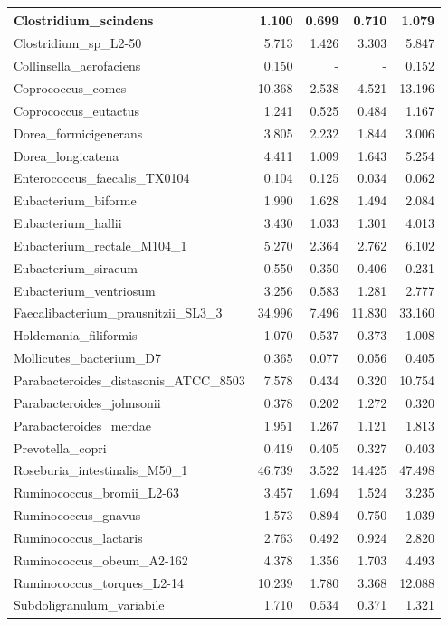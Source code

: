 \documentclass[12pt,a4paper]{article}
\begin{document}
\begin{table}[ht]
\begin{center}
\begin{tabular}{|l*{4}{|r}|}
Clostridium\_scindens & 1.100 & 0.699 & 0.710 & 1.079 \\ \hline
Clostridium\_sp\_L2-50 & 5.713 & 1.426 & 3.303 & 5.847 \\ \hline
Collinsella\_aerofaciens & 0.150 & - & - & 0.152 \\ \hline
Coprococcus\_comes & 10.368 & 2.538 & 4.521 & 13.196 \\ \hline
Coprococcus\_eutactus & 1.241 & 0.525 & 0.484 & 1.167 \\ \hline
Dorea\_formicigenerans & 3.805 & 2.232 & 1.844 & 3.006 \\ \hline
Dorea\_longicatena & 4.411 & 1.009 & 1.643 & 5.254 \\ \hline
Enterococcus\_faecalis\_TX0104 & 0.104 & 0.125 & 0.034 & 0.062 \\ \hline
Eubacterium\_biforme & 1.990 & 1.628 & 1.494 & 2.084 \\ \hline
Eubacterium\_hallii & 3.430 & 1.033 & 1.301 & 4.013 \\ \hline
Eubacterium\_rectale\_M104\_1 & 5.270 & 2.364 & 2.762 & 6.102 \\ \hline
Eubacterium\_siraeum & 0.550 & 0.350 & 0.406 & 0.231 \\ \hline
Eubacterium\_ventriosum & 3.256 & 0.583 & 1.281 & 2.777 \\ \hline
Faecalibacterium\_prausnitzii\_SL3\_3 & 34.996 & 7.496 & 11.830 & 33.160 \\ \hline
Holdemania\_filiformis & 1.070 & 0.537 & 0.373 & 1.008 \\ \hline
Mollicutes\_bacterium\_D7 & 0.365 & 0.077 & 0.056 & 0.405 \\ \hline
Parabacteroides\_distasonis\_ATCC\_8503 & 7.578 & 0.434 & 0.320 & 10.754 \\ \hline
Parabacteroides\_johnsonii & 0.378 & 0.202 & 1.272 & 0.320 \\ \hline
Parabacteroides\_merdae & 1.951 & 1.267 & 1.121 & 1.813 \\ \hline
Prevotella\_copri & 0.419 & 0.405 & 0.327 & 0.403 \\ \hline
Roseburia\_intestinalis\_M50\_1 & 46.739 & 3.522 & 14.425 & 47.498 \\ \hline
Ruminococcus\_bromii\_L2-63 & 3.457 & 1.694 & 1.524 & 3.235 \\ \hline
Ruminococcus\_gnavus & 1.573 & 0.894 & 0.750 & 1.039 \\ \hline
Ruminococcus\_lactaris & 2.763 & 0.492 & 0.924 & 2.820 \\ \hline
Ruminococcus\_obeum\_A2-162 & 4.378 & 1.356 & 1.703 & 4.493 \\ \hline
Ruminococcus\_torques\_L2-14 & 10.239 & 1.780 & 3.368 & 12.088 \\ \hline
Subdoligranulum\_variabile & 1.710 & 0.534 & 0.371 & 1.321 \\ \hline
\end{tabular}
\end{center}
\end{table}
\end{document}
